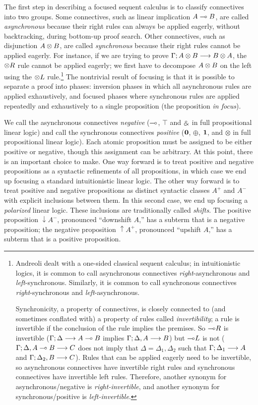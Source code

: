 The first step in describing a focused sequent calculus is to classify
connectives into two groups.  Some connectives, such as linear
implication $A \multimap B$, are called {\it asynchronous} because their
right rules can always be applied eagerly, without backtracking,
during bottom-up proof search. Other connectives, such as disjunction
$A \otimes B$, are called {\it synchronous} because their right rules
cannot be applied eagerly. For instance, if we are trying to prove
${\Gamma};{A \otimes B} \longrightarrow {B \otimes A} \mathstrut$, the ${\otimes}R$ rule cannot
be applied eagerly; we first have to decompose $A \otimes B$ on the
left using the ${\otimes}L$ rule.\footnote{Andreoli dealt with a
  one-sided classical sequent calculus; in intuitionistic logics, it
  is common to call asynchronous connectives {\it right}-asynchronous
  and {\it left}-synchronous. Similarly, it is common to call
  synchronous connectives {\it right}-synchronous and {\it
    left}-asynchronous.

  Synchronicity, a property of connectives, is closely connected to
  (and sometimes conflated with) a property of rules called {\it
    invertibility}; a rule is invertible if the conclusion of the rule
  implies the premises. So ${\multimap}R$ is invertible
  (${\Gamma};{\Delta} \longrightarrow {A \multimap B} \mathstrut$ implies ${\Gamma};{\Delta,
    A} \longrightarrow {B} \mathstrut$) but ${\multimap}L$ is not (${\Gamma};{\Delta, A \multimap
    B} \longrightarrow {C} \mathstrut$ does not imply that $\Delta = \Delta_1, \Delta_2$ such that
  ${\Gamma};{\Delta_1} \longrightarrow {A} \mathstrut$ and ${\Gamma};{\Delta_2, B} \longrightarrow {C} \mathstrut$).
  Rules that can be applied eagerly need to be invertible, so
  asynchronous connectives have invertible right rules and synchronous
  connectives have invertible left rules. Therefore, another synonym
  for asynchronous/negative is {\it right-invertible}, and another
  synonym for synchronous/positive is {\it left-invertible}.}  
The nontrivial result of focusing is that it is possible to separate a
proof into phases: inversion phases in which all asynchronous rules
are applied exhaustively, and focused phases where synchronous rules
are applied repeatedly and exhaustively to a single proposition (the
proposition {\it in focus}). 

We call the asynchronous connectives {\it negative} ($\multimap$, $\top$
and $\mathbin{\binampersand}$ in full propositional linear logic) and call the
synchronous connectives {\it positive} ($\mathbf{0}$, $\oplus$, $\mathbf{1}$, and
$\otimes$ in full propositional linear logic). Each atomic proposition
must be assigned to be either positive or negative, though this
assignment can be arbitrary. At this point, there is an important
choice to make. One way forward is to treat positive and negative
propositions as a syntactic refinements of all propositions, in which
case we end up focusing a standard intuitionistic linear logic. The
other way forward is to treat positive and negative propositions as
distinct syntactic classes $A^+$ and $A^-$ with explicit inclusions
between them. In this second case, we end up focusing a {\it
  polarized} linear logic.  These inclusions are traditionally called
{\it shifts}. The positive proposition ${\downarrow}A^-$, pronounced
``downshift $A$,'' has a subterm that is a negative proposition; the
negative proposition ${\uparrow}A^+$, pronounced ``upshift $A$,'' has
a subterm that is a positive proposition.

